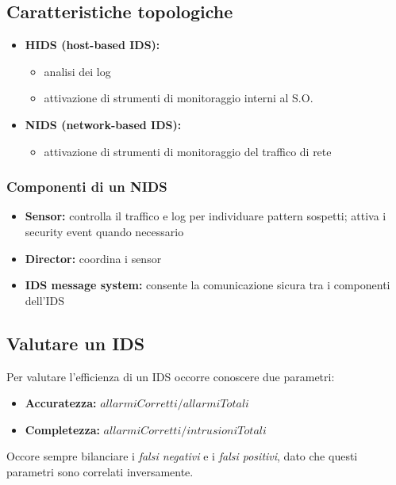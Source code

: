 \subsection{Caratteristiche topologiche}

\begin{itemize}
    \item \textbf{HIDS (host-based IDS):}
    \begin{itemize}
        \item analisi dei log 
        \item attivazione di strumenti di monitoraggio interni al S.O.
    \end{itemize}
    \item \textbf{NIDS (network-based IDS):}
    \begin{itemize}
        \item attivazione di strumenti di monitoraggio del traffico di rete 
    \end{itemize}
\end{itemize}

\subsubsection{Componenti di un NIDS}
\begin{itemize}
    \item \textbf{Sensor:} controlla il traffico e log per individuare pattern sospetti; attiva i 
    security event quando necessario
    \item \textbf{Director:} coordina i sensor 
    \item \textbf{IDS message system:} consente la comunicazione sicura tra i componenti dell'IDS
\end{itemize}



\subsection{Valutare un IDS}
Per valutare l'efficienza di un IDS occorre conoscere due parametri:
\begin{itemize}
    \item \textbf{Accuratezza:} $allarmi Corretti / allarmi Totali$
    \item \textbf{Completezza:} $allarmi Corretti / intrusioni Totali$
\end{itemize}

\noindent Occore sempre bilanciare i \textit{falsi negativi}
e i \textit{falsi positivi}, dato che questi parametri sono correlati inversamente.

